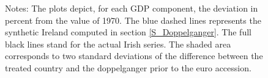 \documentclass[12pt]{article}
\newcommand{\annote}[1]{\parbox{\textwidth}{\renewcommand{\baselinestretch}{1.0}\vspace{12pt} \small Notes: #1}}
\begin{document}
\begin{figure}[h!]
    \annote{The plots depict, for each GDP component, the deviation in percent from the value of 1970. The blue dashed lines represents the synthetic Ireland computed in section \ref{S_Doppelganger}. The full black lines stand for the actual Irish series. The shaded area corresponds to two standard deviations of the difference between the treated country and the doppelganger prior to the euro accession. }
\end{figure}
\end{document}
